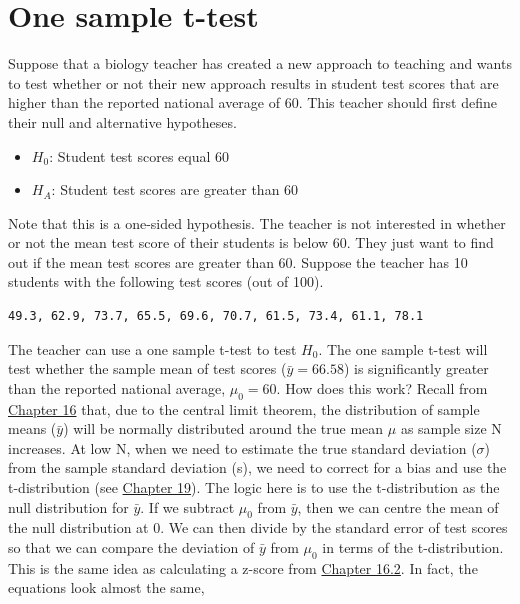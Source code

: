 \documentclass[
  openany]{krantz}
\providecommand{\tightlist}{%
  \setlength{\itemsep}{0pt}\setlength{\parskip}{0pt}}
\begin{document}
\hypertarget{one-sample-t-test}{%
\section{One sample t-test}\label{one-sample-t-test}}

Suppose that a biology teacher has created a new approach to teaching and wants to test whether or not their new approach results in student test scores that are higher than the reported national average of 60.
This teacher should first define their null and alternative hypotheses.

\begin{itemize}
\tightlist
\item
  \(H_{0}\): Student test scores equal 60
\item
  \(H_{A}\): Student test scores are greater than 60
\end{itemize}

Note that this is a one-sided hypothesis.
The teacher is not interested in whether or not the mean test score of their students is below 60.
They just want to find out if the mean test scores are greater than 60.
Suppose the teacher has 10 students with the following test scores (out of 100).

\begin{verbatim}
49.3, 62.9, 73.7, 65.5, 69.6, 70.7, 61.5, 73.4, 61.1, 78.1
\end{verbatim}

The teacher can use a one sample t-test to test \(H_{0}\).
The one sample t-test will test whether the sample mean of test scores (\(\bar{y} = 66.58\)) is significantly greater than the reported national average, \(\mu_{0} = 60\).
How does this work?
Recall from \protect\hyperlink{Chapter_16}{Chapter 16} that, due to the central limit theorem, the distribution of sample means (\(\bar{y}\)) will be normally distributed around the true mean \(\mu\) as sample size N increases.
At low N, when we need to estimate the true standard deviation (\(\sigma\)) from the sample standard deviation (s), we need to correct for a bias and use the t-distribution (see \protect\hyperlink{Chapter_19}{Chapter 19}).
The logic here is to use the t-distribution as the null distribution for \(\bar{y}\).
If we subtract \(\mu_{0}\) from \(\bar{y}\), then we can centre the mean of the null distribution at 0.
We can then divide by the standard error of test scores so that we can compare the deviation of \(\bar{y}\) from \(\mu_{0}\) in terms of the t-distribution.
This is the same idea as calculating a z-score from \protect\hyperlink{probability-and-z-scores}{Chapter 16.2}.
In fact, the equations look almost the same,
\end{document}
